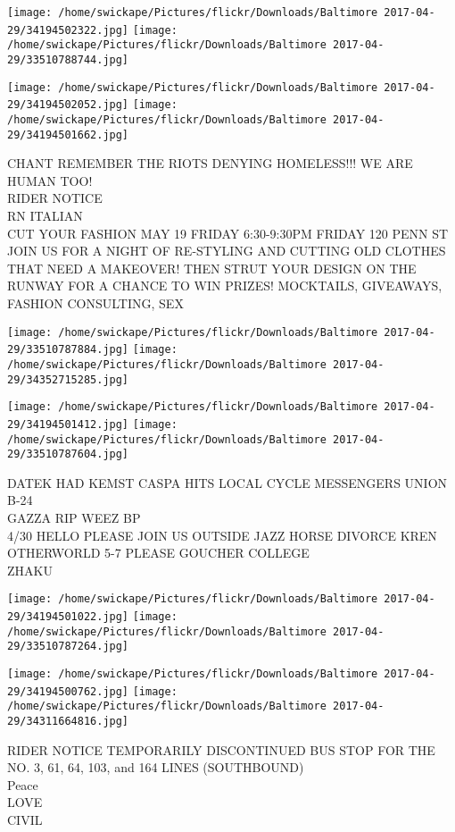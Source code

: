 \documentclass[10pt,letterpaper]{article}
\begin{document}
\texttt{[image: /home/swickape/Pictures/flickr/Downloads/Baltimore 2017-04-29/34194502322.jpg]}
\texttt{[image: /home/swickape/Pictures/flickr/Downloads/Baltimore 2017-04-29/33510788744.jpg]}

\texttt{[image: /home/swickape/Pictures/flickr/Downloads/Baltimore 2017-04-29/34194502052.jpg]}
\texttt{[image: /home/swickape/Pictures/flickr/Downloads/Baltimore 2017-04-29/34194501662.jpg]}

CHANT REMEMBER THE RIOTS DENYING HOMELESS!!! WE ARE HUMAN TOO!\\
RIDER NOTICE\\
RN ITALIAN\\
CUT YOUR FASHION MAY 19 FRIDAY 6:30{-}9:30PM FRIDAY 120 PENN ST JOIN US FOR A NIGHT OF RE{-}STYLING AND CUTTING OLD CLOTHES THAT NEED A MAKEOVER!  THEN STRUT YOUR DESIGN ON THE RUNWAY FOR A CHANCE TO WIN PRIZES!  MOCKTAILS, GIVEAWAYS, FASHION CONSULTING, SEX\\
\pagebreak

\texttt{[image: /home/swickape/Pictures/flickr/Downloads/Baltimore 2017-04-29/33510787884.jpg]}
\texttt{[image: /home/swickape/Pictures/flickr/Downloads/Baltimore 2017-04-29/34352715285.jpg]}

\texttt{[image: /home/swickape/Pictures/flickr/Downloads/Baltimore 2017-04-29/34194501412.jpg]}
\texttt{[image: /home/swickape/Pictures/flickr/Downloads/Baltimore 2017-04-29/33510787604.jpg]}

DATEK HAD KEMST CASPA HITS LOCAL CYCLE MESSENGERS UNION B{-}24\\
GAZZA RIP WEEZ BP\\
4/30 HELLO PLEASE JOIN US OUTSIDE JAZZ HORSE DIVORCE KREN OTHERWORLD 5{-}7 PLEASE GOUCHER COLLEGE\\
ZHAKU\\
\pagebreak

\texttt{[image: /home/swickape/Pictures/flickr/Downloads/Baltimore 2017-04-29/34194501022.jpg]}
\texttt{[image: /home/swickape/Pictures/flickr/Downloads/Baltimore 2017-04-29/33510787264.jpg]}

\texttt{[image: /home/swickape/Pictures/flickr/Downloads/Baltimore 2017-04-29/34194500762.jpg]}
\texttt{[image: /home/swickape/Pictures/flickr/Downloads/Baltimore 2017-04-29/34311664816.jpg]}

RIDER NOTICE TEMPORARILY DISCONTINUED BUS STOP FOR THE NO. 3, 61, 64, 103, and 164 LINES (SOUTHBOUND)\\
Peace\\
LOVE\\
CIVIL\\
\pagebreak
\end{document}

